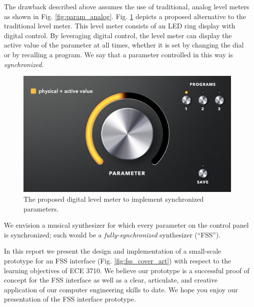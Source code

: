 \documentclass[conference]{IEEEtran}
\begin{document}
The drawback described above assumes the use of traditional, analog level meters as shown in Fig. \ref{fig:param_analog}. Fig. \ref{fig:param_digital} depicts a proposed alternative to the traditional level meter. This level meter consists of an LED ring display with digital control. By leveraging digital control, the level meter can display the active value of the parameter at all times, whether it is set by changing the dial or by recalling a program. We say that a parameter controlled in this way is \textit{synchronized}.

\begin{figure}[bhtp]
    \centering
    \includegraphics[width=\columnwidth]{./resources/figures/param_digital.png}
    \caption{The proposed digital level meter to implement synchronized parameters.}
    \label{fig:param_digital}
\end{figure}

We envision a musical synthesizer for which every parameter on the control panel is synchronized; such would be a \textit{fully-synchronized} synthesizer (``FSS'').

In this report we present the design and implementation of a small-scale prototype for an FSS interface (Fig. \ref{fig:fss_cover_art}) with respect to the learning objectives of ECE 3710. We believe our prototype is a successful proof of concept for the FSS interface as well as a clear, articulate, and creative application of our computer engineering skills to date. We hope you enjoy our presentation of the FSS interface prototype.
\end{document}
